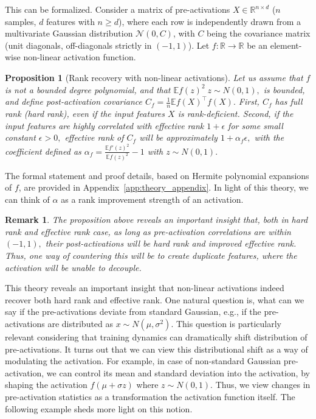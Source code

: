 \documentclass{article}
\newcommand{\R}{\mathbb{R}}
\newcommand{\E}{\mathbb{E}}
\newcommand{\ff}[1]{\todo[color=blue!30,size=\tiny]{FF: #1}}
\newtheorem{proposition}{Proposition}[section]
\newtheorem{remark}{Remark}[section]
\numberwithin{figure}{section}
\begin{document}
This can be formalized. Consider a matrix of pre-activations $X \in \R^{n \times d}$ ($n$ samples, $d$ features with $n\ge d$), where each row is independently drawn from a multivariate Gaussian distribution $\mathcal{N}(0, C)$, with $C$ being the covariance matrix (unit diagonals, off-diagonals strictly in $(-1,1)$). Let $f: \R \to \R$ be an element-wise non-linear activation function.

\begin{proposition}[Rank recovery with non-linear activations]
\label{prop:rank_recovery_informal}
\label{prop:hard_rank_increase_main} %
Let us assume that  $f$ is not a bounded degree polynomial, and that $\E f(z)^2\; z\sim N(0,1),$ is bounded, and define post-activation covariance $C_f = \frac1n \E f(X)^\top f(X).$ First, $C_f$ has full rank (hard rank), even if the input features $X$ is rank-deficient. Second, if the input features are highly correlated with effective rank $1+\epsilon$ for some small constant $\epsilon>0,$ effective rank of $C_f$ will be approximately  $1 + \alpha_f \epsilon,$ with the coefficient defined as $\alpha_f = \frac{\E f'(z)^2}{\E f(z)^2 } - 1$ with $z\sim N(0,1).$
\end{proposition}
The formal statement and proof details, based on Hermite polynomial expansions of $f$, are provided in Appendix~\ref{app:theory_appendix}. In light of this theory, we can think of $\alpha$ as a rank improvement strength of an activation.

\begin{remark}
\label{rem:duplicate_rank}
    The proposition above reveals an important insight that, both in hard rank and effective rank case, as long as pre-activation correlations are within $(-1,1),$ their post-activations will be hard rank and improved effective rank. Thus, one way of countering this will be to create duplicate features, where the activation will be unable to decouple.\ff{what is "hard rank"?}
\end{remark}

This theory reveals an important insight that non-linear activations indeed recover both hard rank and effective rank.  One natural question is, what can we say if the pre-activations deviate from standard Gaussian, e.g., if the pre-activations are distributed as $x\sim N(\mu,\sigma^2).$ This question is particularly relevant considering that training dynamics can dramatically shift distribution of pre-activations. It turns out that we can view this distributional shift as a way of modulating the activation. For example, in case of non-standard Gaussian pre-activation, we can control its mean and standard deviation into the activation, by shaping the activation $f(\mu + \sigma z)$ where $z\sim N(0,1)$. Thus, we view  changes in pre-activation statistics as a transformation the activation function itself. The following example sheds more light on this notion.
\end{document}
